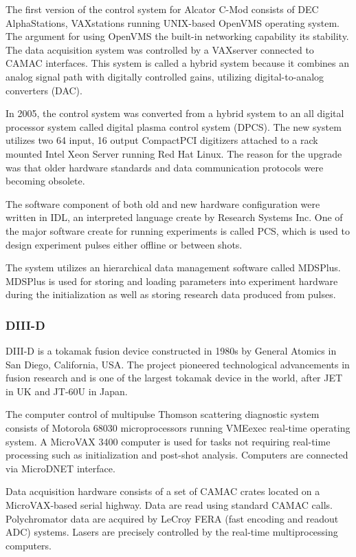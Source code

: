 The first version of the control system for Alcator C-Mod consists of DEC AlphaStations, VAXstations running UNIX-based OpenVMS operating system. The argument for using OpenVMS the built-in networking capability its stability. The data acquisition system was controlled by a VAXserver connected to CAMAC interfaces\cite{fredian1997data}. This system is called a hybrid system because it combines an analog signal path with digitally controlled gains, utilizing digital-to-analog converters (DAC)\cite{horne1993performance}.

In 2005, the control system was converted from a hybrid system to an all digital processor system called digital plasma control system (DPCS)\cite{Stillerman20061905}. The new system utilizes two 64 input, 16 output CompactPCI digitizers attached to a rack mounted Intel Xeon Server running Red Hat Linux. The reason for the upgrade was that older hardware standards and data communication protocols were becoming obsolete.

The software component of both old and new hardware configuration were written in IDL, an interpreted language create by Research Systems Inc. One of the major software create for running experiments is called PCS, which is used to design experiment pulses either offline or between shots.

The system utilizes an hierarchical data management software called MDSPlus\cite{stillerman1997mdsplus}. MDSPlus is used for storing and loading parameters into experiment hardware during the initialization as well as storing research data produced from pulses.

\subsubsection{DIII-D}

DIII-D is a tokamak fusion device constructed in 1980s by General Atomics in San Diego, California, USA. The project pioneered technological advancements in fusion research and is one of the largest tokamak device in the world, after JET in UK and JT-60U in Japan.

The computer control of multipulse Thomson scattering diagnostic system\cite{greenfield1990real} consists of Motorola 68030 microprocessors running VMEexec real-time operating system. A MicroVAX 3400 computer is used for tasks not requiring real-time processing such as initialization and post-shot analysis. Computers are connected via MicroDNET interface. 

Data acquisition hardware consists of a set of CAMAC crates located on a MicroVAX-based serial highway. Data are read using standard CAMAC calls. Polychromator data are acquired by LeCroy FERA (fast encoding and readout ADC) systems. Lasers are precisely controlled by the real-time multiprocessing computers.

